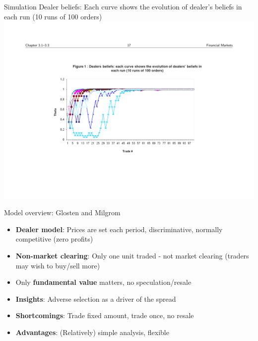 \documentclass[english,10pt]{beamer}
\begin{document}
\begin{frame}{Simulation}
	Dealer beliefs: Each curve shows the evolution of dealer's beliefs in each run (10 runs of 100 orders)
	\quad
	\center
	\includegraphics[width=1\linewidth]{pics/DealerBeliefs_Image.pdf}
\end{frame}


\begin{frame}[label=overview]{Model overview: Glosten and Milgrom}
	\begin{itemize}
		\item \textbf{Dealer model}: Prices are set each period, discriminative, normally competitive (zero profits)
		\item \textbf{Non-market clearing}: Only one unit traded  - not market clearing (traders may wish to buy/sell more)
		\item Only \textbf{fundamental value} matters,  no speculation/resale
	\end{itemize}
	\begin{itemize}
		\item \textbf{Insights}: Adverse selection as a driver of the spread
		\item \textbf{Shortcomings}: Trade fixed amount, trade once, no resale
		\item \textbf{Advantages}: (Relatively) simple analysis, flexible %
	\end{itemize}
\end{frame}
\end{document}
